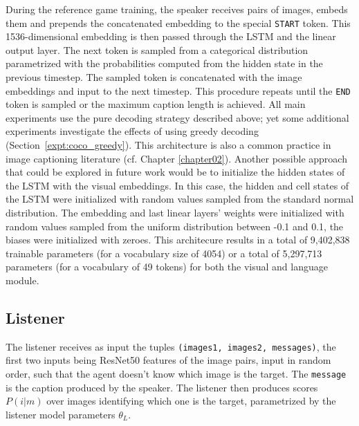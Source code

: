During the reference game training, the speaker receives pairs of images, embeds them and prepends the concatenated embedding to the special \texttt{START} token. This 1536-dimensional embedding is then passed through the LSTM and the linear output layer. The next token is sampled from a categorical distribution parametrized with the probabilities computed from the hidden state in the previous timestep. The sampled token is concatenated with the image embeddings and input to the next timestep. This procedure repeats until the \texttt{END} token is sampled or the maximum caption length is achieved. All main experiments use the pure decoding strategy described above; yet some additional experiments investigate the effects of using greedy decoding (Section~\ref{expt:coco_greedy}). This architecture is also a common practice in image captioning literature (cf. Chapter \ref{chapter02}). Another possible approach that could be explored in future work would be to initialize the hidden states of the LSTM with the visual embeddings. In this case, the hidden and cell states of the LSTM were initialized with random values sampled from the standard normal distribution. The embedding and last linear layers' weights were initialized with random values sampled from the uniform distribution between -0.1 and 0.1, the biases were initialized with zeroes.  
This architecure results in a total of 9,402,838 trainable parameters (for a vocabulary  size of 4054) or a total of 5,297,713 parameters (for a vocabulary of 49 tokens) for both the visual and language module.  %

\subsection{Listener}
The listener receives as input the tuples \texttt{(images1, images2, messages)}, the first two inputs being ResNet50 features of the image pairs, input in random order, such that the agent doesn't know which image is the target. The \texttt{message} is the caption produced by the speaker. The listener then produces scores $P(i|m)$ over images identifying which one is the target, parametrized by the listener model parameters $\theta_L$.

